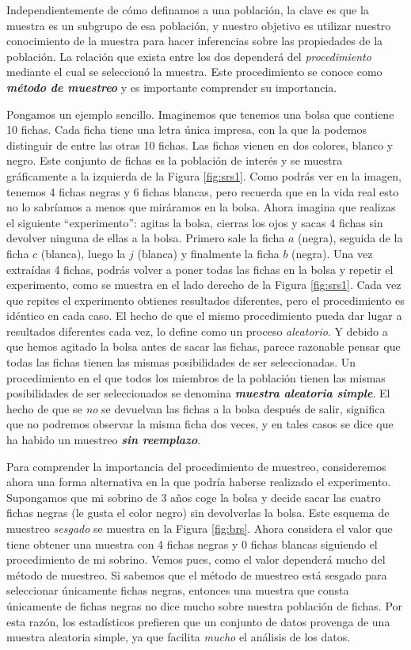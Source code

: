 \documentclass[spanish,]{book}
\begin{document}
Independientemente de cómo definamos a una población, la clave es que la
muestra es un subgrupo de esa población, y nuestro objetivo es utilizar
nuestro conocimiento de la muestra para hacer inferencias sobre las
propiedades de la población. La relación que exista entre los dos
dependerá del \emph{procedimiento} mediante el cual se seleccionó la
muestra. Este procedimiento se conoce como \textbf{\emph{método de
muestreo}} y es importante comprender su importancia.

Pongamos un ejemplo sencillo. Imaginemos que tenemos una bolsa que
contiene 10 fichas. Cada ficha tiene una letra única impresa, con la que
la podemos distinguir de entre las otras 10 fichas. Las fichas vienen en
dos colores, blanco y negro. Este conjunto de fichas es la población de
interés y se muestra gráficamente a la izquierda de la Figura
\ref{fig:srs1}. Como podrás ver en la imagen, tenemos 4 fichas negras y
6 fichas blancas, pero recuerda que en la vida real esto no lo sabríamos
a menos que miráramos en la bolsa. Ahora imagina que realizas el
siguiente ``experimento'': agitas la bolsa, cierras los ojos y sacas 4
fichas sin devolver ninguna de ellas a la bolsa. Primero sale la ficha
\(a\) (negra), seguida de la ficha \(c\) (blanca), luego la \(j\)
(blanca) y finalmente la ficha \(b\) (negra). Una vez extraídas 4
fichas, podrás volver a poner todas las fichas en la bolsa y repetir el
experimento, como se muestra en el lado derecho de la Figura
\ref{fig:srs1}. Cada vez que repites el experimento obtienes resultados
diferentes, pero el procedimiento es idéntico en cada caso. El hecho de
que el mismo procedimiento pueda dar lugar a resultados diferentes cada
vez, lo define como un proceso \emph{aleatorio}. Y debido a que hemos
agitado la bolsa antes de sacar las fichas, parece razonable pensar que
todas las fichas tienen las mismas posibilidades de ser seleccionadas.
Un procedimiento en el que todos los miembros de la población tienen las
mismas posibilidades de ser seleccionados se denomina
\textbf{\emph{muestra aleatoria simple}}. El hecho de que se \emph{no}
se devuelvan las fichas a la bolsa después de salir, significa que no
podremos observar la misma ficha dos veces, y en tales casos se dice que
ha habido un muestreo \textbf{\emph{sin reemplazo}}.

Para comprender la importancia del procedimiento de muestreo,
consideremos ahora una forma alternativa en la que podría haberse
realizado el experimento. Supongamos que mi sobrino de 3 años coge la
bolsa y decide sacar las cuatro fichas negras (le gusta el color negro)
sin devolverlas la bolsa. Este esquema de muestreo \emph{sesgado} se
muestra en la Figura \ref{fig:brs}. Ahora considera el valor que tiene
obtener una muestra con 4 fichas negras y 0 fichas blancas siguiendo el
procedimiento de mi sobrino. Vemos pues, como el valor dependerá mucho
del método de muestreo. Si sabemos que el método de muestreo está
sesgado para seleccionar únicamente fichas negras, entonces una muestra
que consta únicamente de fichas negras no dice mucho sobre nuestra
población de fichas. Por esta razón, los estadísticos prefieren que un
conjunto de datos provenga de una muestra aleatoria simple, ya que
facilita \emph{mucho} el análisis de los datos.
\end{document}
